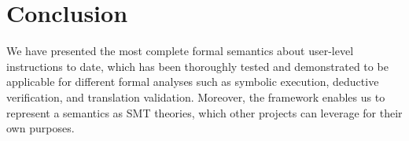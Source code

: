 \section{Conclusion}\label{sec:conc}

We have presented the most complete formal semantics about \ISA user-level instructions
to date, which has been thoroughly tested and demonstrated  to be applicable
for different formal analyses such as symbolic execution, deductive
verification, and translation validation.
Moreover, the \K framework enables us to represent a semantics as SMT theories,
which other projects can
leverage for their own purposes.


   
